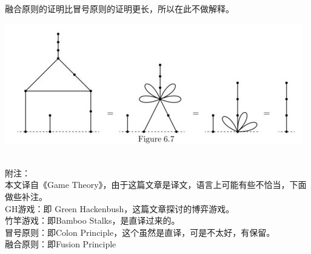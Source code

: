 	融合原则的证明比冒号原则的证明更长，所以在此不做解释。
	\begin{center}
		\includegraphics{./source/img11.jpg}
	\end{center}
	~\\
	附注：\\
	本文译自《Game Theory》，由于这篇文章是译文，语言上可能有些不恰当，下面做些补注。\\
	GH游戏：即 Green Hackenbush，这篇文章探讨的博弈游戏。\\
	竹竿游戏：即Bamboo Stalks，是直译过来的。\\
	冒号原则：即Colon Principle，这个虽然是直译，可是不太好，有保留。\\
	融合原则：即Fusion Principle\\
%	
%